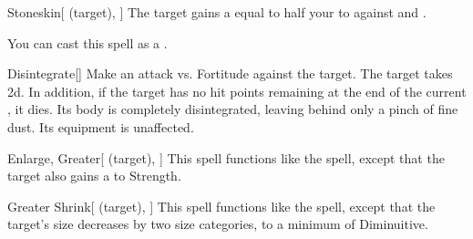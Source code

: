 \lowercase{\hypertarget{spell:Stoneskin}{}}\label{spell:Stoneskin}
\begin{attuneability}[Rank 5]{\hypertarget{spell:Stoneskin}{Stoneskin}}[ (target), ]
The target gains a  equal to half your  to  against  and .

You can cast this spell as a .
\end{attuneability}
\vspace{0.25em}



\lowercase{\hypertarget{spell:Disintegrate}{}}\label{spell:Disintegrate}
\begin{freeability}[Rank 6]{\hypertarget{spell:Disintegrate}{Disintegrate}}[]
Make an attack vs. Fortitude against the target.
\hit The target takes  \plus2d.
In addition, if the target has no hit points remaining at the end of the current , it dies.
Its body is completely disintegrated, leaving behind only a pinch of fine dust.
Its equipment is unaffected.
\end{freeability}
\vspace{0.25em}



\lowercase{\hypertarget{spell:Enlarge, Greater}{}}\label{spell:Enlarge, Greater}
\begin{attuneability}[Rank 6]{\hypertarget{spell:Enlarge, Greater}{Enlarge, Greater}}[ (target), ]
This spell functions like the  spell, except that the target also gains a   to Strength.
\end{attuneability}
\vspace{0.25em}



\lowercase{\hypertarget{spell:Greater Shrink}{}}\label{spell:Greater Shrink}
\begin{attuneability}[Rank 6]{\hypertarget{spell:Greater Shrink}{Greater Shrink}}[ (target), ]
This spell functions like the  spell, except that the target's size decreases by two size categories, to a minimum of Diminuitive.
\end{attuneability}
\vspace{0.25em}



